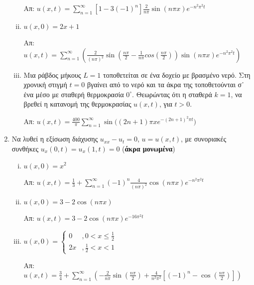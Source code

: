 \documentclass[a4paper,table]{report}
\begin{document}
\begin{enumerate}
\begin{enumerate}[(i)]
			\hfill Απ: $ u(x,t) = \sum_{n=1}^{\infty}[1-3(-1)^{n}] \frac{ 2 }{ n\pi } \sin{(n\pi x)}
			e^{-n^{2} \pi ^{2} t} $
			 
		\item $ u(x,0) = 2x+1 $

			\hfill Απ: $ u(x,t) = \sum_{n=1}^{\infty} (\frac{ 2 }{ (n\pi)^{2}} \sin{(\frac{ n\pi }{
			2 } - \frac{1}{ n\pi } cos(\frac{ n\pi }{ 2 }))} \sin{( n\pi x )} e^{-n^{2}\pi^{2}t}) $

		\item Μια ράβδος μήκους $L=1$ τοποθετείται σε ένα δοχείο με βρασμένο νερό. Στη χρονική
			στιγμή $ t=0 $ βγαίνει από το νερό και τα άκρα της τοποθετούνται σ᾽ ένα μέσο με σταθερή
			θερμοκρασία $ 0^{\circ}  $. Θεωρώντας ότι η σταθερά $ k=1 $, να βρεθεί η κατανομή
			της θερμοκρασίας $ u(x,t) $, για $ t>0 $.

			\hfill Απ: $ u(x,t) = \frac{ 400 }{ \pi } \sum_{n=1}^{\infty} \sin{((2n+1) \pi
			x}e^{-(2n+1)^{2}\pi t} ) $

		\end{enumerate}

	\item Να λυθεί η εξίσωση διάχυσης $ u_{xx} - u_t = 0 $, $ u=u(x,t) $, με συνοριακές συνθήκες $
		u_x(0,t) = u_x(1,t) = 0 $ ({\bfseries άκρα μονωμένα})

		\begin{enumerate}[(i)]
			\item $u(x,0) = x^{2}$ 

				\hfill Απ: $ u(x,t) = \frac{1}{ 3 } + \sum_{n=1}^{\infty} (-1)^{n} \frac{ 4 }{
				(n\pi)^{2}} \cos{(n\pi x)} e^{-n^{2}\pi^{2}t} $

			\item $ u(x,0) = 3 - 2 \cos{(n\pi x)}  $

				\hfill Απ: $ u(x,t) = 3 - 2 \cos{(n\pi x)} e^{-16\pi^{2}t} $

			\item $ u(x,0) = \begin{cases} 0 &, 0<x\leq \frac{ 1 }{ 2 } \\ 2x &, \frac{1}{ 2 }
					<x <1 
		\end{cases}$

					\hfill Απ: $ u(x,t) = \frac{ 3 }{ 4 } + \sum_{n=1}^{\infty}\left(- \frac{ 2 }{
						n\pi } \sin{\left(\frac{ n\pi }{ 2 }\right)}+ \frac{ 4 }{ n^{2} \pi ^{2} }\left[(-1)^{n}-
					\cos{\left(\frac{ n\pi }{ 2 }\right)}\right]\right)  $

\end{enumerate}



\end{enumerate}
\end{document}
